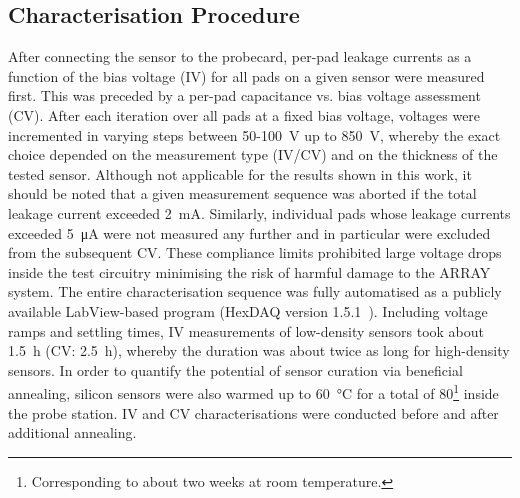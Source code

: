 \subsection{Characterisation Procedure}
\label{subsec:setup_procedure}
After connecting the sensor to the probecard, per-pad leakage currents as a function of the bias voltage (IV) for all pads on a given sensor were measured first.
This was preceded by a per-pad capacitance vs. bias voltage assessment (CV).
After each iteration over all pads at a fixed bias voltage, voltages were incremented in varying steps between 50-\SI{100}{\volt} up to \SI{850}{\volt}, whereby the exact choice depended on the measurement type (IV/CV) and on the thickness of the tested sensor.
Although not applicable for the results shown in this work, it should be noted that a given measurement sequence was aborted if the total leakage current exceeded \SI{2}{\milli\ampere}.
Similarly, individual pads whose leakage currents exceeded \SI{5}{\micro\ampere} were not measured any further and in particular were excluded from the subsequent CV.
These compliance limits prohibited large voltage drops inside the test circuitry minimising the risk of harmful damage to the ARRAY system.
The entire characterisation sequence was fully automatised as a publicly available LabView-based program (HexDAQ version 1.5.1~\cite{labview_hexdaq}).
Including voltage ramps and settling times, IV measurements of low-density sensors took about \SI{1.5}{\hour} (CV: \SI{2.5}{\hour}), whereby the duration was about twice as long for high-density sensors.
In order to quantify the potential of sensor curation via beneficial annealing, silicon sensors were also warmed up to \SI{60}{\celsius} for a total of \SI{80}{\min}\footnote{Corresponding to about two weeks at room temperature.} inside the probe station.
IV and CV characterisations were conducted before and after additional annealing.